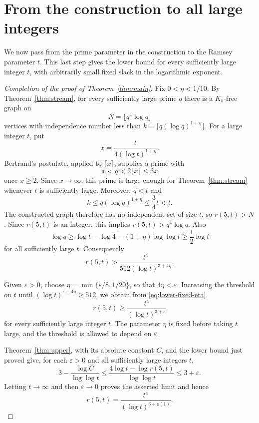\section{From the construction to all large integers}\label{sec:conclusion}

We now pass from the prime parameter in the construction to the Ramsey
parameter $t$.  This last step gives the lower bound for every
sufficiently large integer $t$, with arbitrarily small fixed slack in
the logarithmic exponent.

\begin{proof}[Completion of the proof of Theorem~\ref{thm:main}]
Fix $0<\eta<1/10$.  By Theorem~\ref{thm:stream}, for every sufficiently
large prime $q$ there is a $K_5$-free graph on
\[
 N=\lfloor q^4\log q\rfloor
\]
vertices with independence number less than
$k=\lfloor q(\log q)^{1+\eta}\rfloor$.
For a large integer $t$, put
\[
 x=\frac{t}{4(\log t)^{1+\eta}}.
\]
Bertrand's postulate, applied to $\lceil x\rceil$, supplies a prime with
\[
 x<q<2\lceil x\rceil\le3x
\]
once $x\ge2$.  Since $x\to\infty$, this prime is large enough for
Theorem~\ref{thm:stream} whenever $t$ is sufficiently large.
Moreover, $q<t$ and
\[
 k\le q(\log q)^{1+\eta}\le\frac34t<t.
\]
The constructed graph therefore has no independent set of size $t$,
so $r(5,t)>N$.  Since $r(5,t)$ is an integer, this implies
$r(5,t)>q^4\log q$.
Also
\[
 \log q\ge\log t-\log4-(1+\eta)\log\log t
 \ge\frac12\log t
\]
for all sufficiently large $t$.  Consequently
\begin{equation}\label{eq:lower-fixed-eta}
 r(5,t)>\frac{t^4}{512(\log t)^{3+4\eta}}.
\end{equation}

Given $\varepsilon>0$, choose
$\eta=\min\{\varepsilon/8,1/20\}$, so that $4\eta<\varepsilon$.
Increasing the threshold on $t$ until
$(\log t)^{\varepsilon-4\eta}\ge512$, we obtain from
\eqref{eq:lower-fixed-eta}
\[
 r(5,t)\ge\frac{t^4}{(\log t)^{3+\varepsilon}}
\]
for every sufficiently large integer $t$.
The parameter $\eta$ is fixed before taking $t$ large, and the threshold
is allowed to depend on $\varepsilon$.

Theorem~\ref{thm:upper}, with its absolute constant $C$, and the lower
bound just proved give, for each $\varepsilon>0$ and all sufficiently
large integers $t$,
\[
 3-\frac{\log C}{\log\log t}
 \le\frac{4\log t-\log r(5,t)}{\log\log t}
 \le3+\varepsilon.
\]
Letting $t\to\infty$ and then $\varepsilon\to0$ proves the asserted
limit and hence
\[
 r(5,t)=\frac{t^4}{(\log t)^{3+o(1)}}.
\]
\end{proof}
